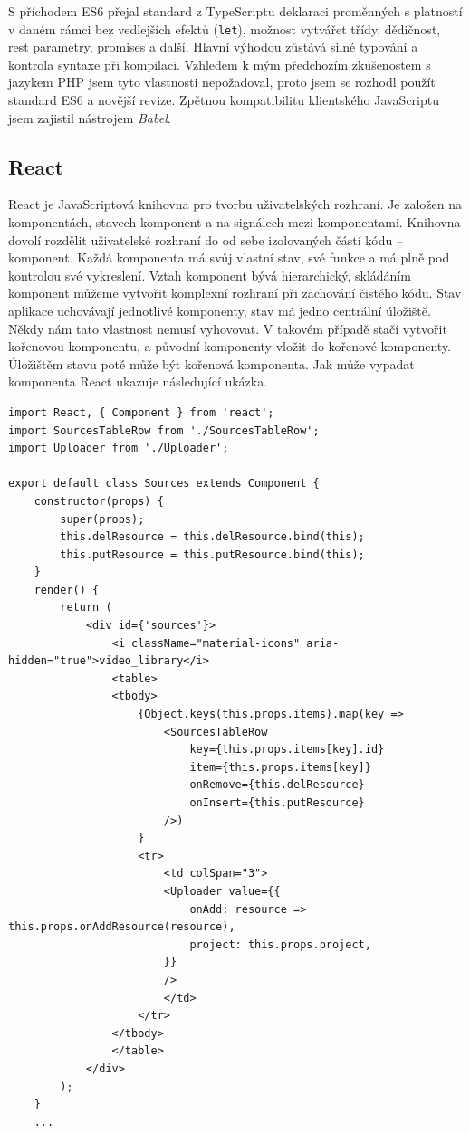 S příchodem ES6 přejal standard z TypeScriptu deklaraci proměnných s platností v daném rámci bez vedlejších efektů (\texttt{let}), možnost vytvářet třídy, dědičnost, rest parametry, promises a další. Hlavní výhodou zůstává silné typování a kontrola syntaxe při kompilaci. Vzhledem k mým předchozím zkušenostem s jazykem PHP jsem tyto vlastnosti nepožadoval, proto jsem se rozhodl použít standard ES6 a novější revize. Zpětnou kompatibilitu klientského JavaScriptu jsem zajistil nástrojem \textit{Babel}.

\subsection{React}
React je JavaScriptová knihovna pro tvorbu uživatelských rozhraní. Je založen na komponentách, stavech komponent a na signálech mezi komponentami. Knihovna dovolí rozdělit uživatelské rozhraní do od sebe izolovaných částí kódu -- komponent. Každá komponenta má svůj vlastní stav, své funkce a má plně pod kontrolou své vykreslení. Vztah komponent bývá hierarchický, skládáním komponent můžeme vytvořit komplexní rozhraní při zachování čistého kódu. Stav aplikace uchovávají jednotlivé komponenty, stav má jedno centrální úložiště. Někdy nám tato vlastnost nemusí vyhovovat. V takovém případě stačí vytvořit kořenovou komponentu, a původní komponenty vložit do kořenové komponenty. Úložištěm stavu poté může být kořenová komponenta. Jak může vypadat komponenta React ukazuje následující ukázka.
\begin{lstlisting}[style=JavaScript]
import React, { Component } from 'react';
import SourcesTableRow from './SourcesTableRow';
import Uploader from './Uploader';

export default class Sources extends Component {
    constructor(props) {
        super(props);
        this.delResource = this.delResource.bind(this);
        this.putResource = this.putResource.bind(this);
    }
    render() {
        return (
            <div id={'sources'}>
                <i className="material-icons" aria-hidden="true">video_library</i>
                <table>
                <tbody>
                    {Object.keys(this.props.items).map(key =>
                        <SourcesTableRow
                            key={this.props.items[key].id}
                            item={this.props.items[key]}
                            onRemove={this.delResource}
                            onInsert={this.putResource}
                        />)
                    }
                    <tr>
                        <td colSpan="3">
                        <Uploader value={{
                            onAdd: resource => this.props.onAddResource(resource),
                            project: this.props.project,
                        }}
                        />
                        </td>
                    </tr>
                </tbody>
                </table>
            </div>
        );
    }
    ...
\end{lstlisting}

